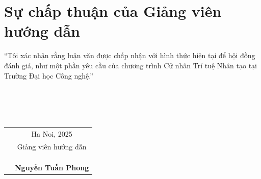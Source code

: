 \chapter*{Sự chấp thuận của Giảng viên hướng dẫn}


“Tôi xác nhận rằng luận văn được chấp nhận với hình thức hiện tại để hội đồng đánh giá, như một phần yêu cầu của chương trình Cử nhân Trí tuệ Nhân tạo tại Trường Đại học Công nghệ.”
\\
\\
\\
\\
\\
\begin{table}[!ht]
\begin{tabular}{p{}c}
 & Ha Noi, 2025 \\
 & Giảng viên hướng dẫn \\
 &              \\
 &              \\
 &              \\
 & \textbf{Nguyễn Tuấn Phong} 
\end{tabular}
\end{table}